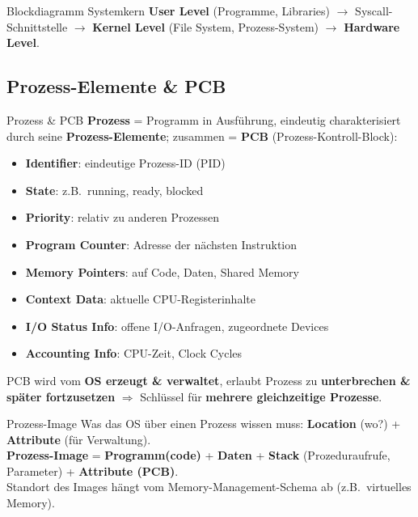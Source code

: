 \documentclass[a4paper, fontsize=7pt]{scrartcl}
\begin{document}
\begin{subbox}{Blockdiagramm Systemkern}
\textbf{User Level} (Programme, Libraries) $\to$ Syscall-Schnittstelle
$\to$ \textbf{Kernel Level} (File System, Prozess-System) $\to$
\textbf{Hardware Level}.
\end{subbox}

\subsection{Prozess-Elemente \& PCB}

\begin{mainbox}{Prozess \& PCB}
\textbf{Prozess} = Programm in Ausführung, eindeutig charakterisiert durch
seine \textbf{Prozess-Elemente}; zusammen = \textbf{PCB} (Prozess-Kontroll-Block):
\begin{itemize}
    \item \textbf{Identifier}: eindeutige Prozess-ID (PID)
    \item \textbf{State}: z.B.\ running, ready, blocked
    \item \textbf{Priority}: relativ zu anderen Prozessen
    \item \textbf{Program Counter}: Adresse der nächsten Instruktion
    \item \textbf{Memory Pointers}: auf Code, Daten, Shared Memory
    \item \textbf{Context Data}: aktuelle CPU-Registerinhalte
    \item \textbf{I/O Status Info}: offene I/O-Anfragen, zugeordnete Devices
    \item \textbf{Accounting Info}: CPU-Zeit, Clock Cycles
\end{itemize}
PCB wird vom \textbf{OS erzeugt \& verwaltet}, erlaubt Prozess zu
\textbf{unterbrechen \& später fortzusetzen} $\Rightarrow$ Schlüssel für
\textbf{mehrere gleichzeitige Prozesse}.
\end{mainbox}

\begin{mainbox}{Prozess-Image}
Was das OS über einen Prozess wissen muss: \textbf{Location} (wo?) +
\textbf{Attribute} (für Verwaltung).\\
\textbf{Prozess-Image} = \textbf{Programm(code)} + \textbf{Daten} +
\textbf{Stack} (Prozeduraufrufe, Parameter) + \textbf{Attribute (PCB)}.\\
Standort des Images hängt vom Memory-Management-Schema ab (z.B.\
virtuelles Memory).
\end{mainbox}
\end{document}
